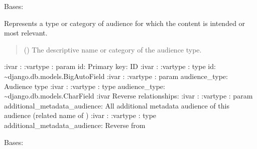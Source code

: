 \documentclass[letterpaper,10pt,english]{sphinxmanual}
\begin{document}
\begin{fulllineitems}
\label{\detokenize{source/meta_models_management:meta_models_management.models.Audience}}
\pysigstartsignatures
{}
\pysigstopsignatures
\sphinxAtStartPar
Bases: 

\sphinxAtStartPar
Represents a type or category of audience for which the content is intended or most relevant.
\begin{quote}\begin{description}
\sphinxAtStartPar
{} () \textendash{} The descriptive name or category of the audience type.

\end{description}\end{quote}

\sphinxAtStartPar
:ivar : 
:vartype : param id: Primary key: ID
:ivar : 
:vartype : type id: \textasciitilde{}django.db.models.BigAutoField
:ivar : 
:vartype : param audience\_type: Audience type
:ivar :
:vartype : type audience\_type: \textasciitilde{}django.db.models.CharField
:ivar Reverse relationships:
:ivar : 
:vartype : param additional\_metadata\_audience: All additional metadata audience of this audience (related name of )
:ivar : 
:vartype : type additional\_metadata\_audience: Reverse  from {\hyperref[\detokenize{source/meta_models_management:meta_models_management.models.AdditionalMetadata}]{}}

\begin{fulllineitems}
\label{\detokenize{source/meta_models_management:meta_models_management.models.Audience.DoesNotExist}}
\pysigstartsignatures
{}
\pysigstopsignatures
\sphinxAtStartPar
Bases: 


\end{fulllineitems}
\end{fulllineitems}
\end{document}
